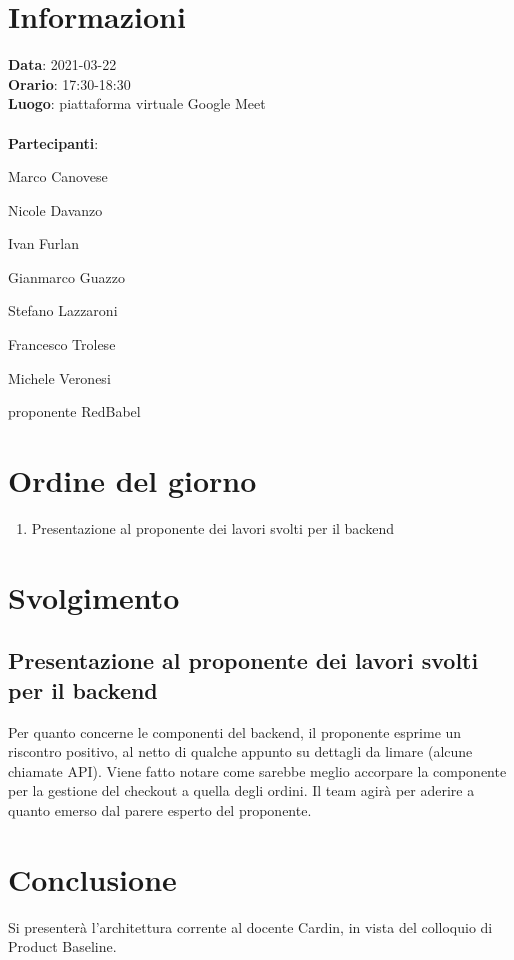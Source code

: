 \section{Informazioni}
\textbf{Data}: 2021-03-22 \\
\textbf{Orario}: 17:30-18:30 \\
\textbf{Luogo}: piattaforma virtuale Google Meet \\\\
\textbf{Partecipanti}:\begin{list}{*}{\setlength{\itemsep}{0cm}}
	\item Marco Canovese
	\item Nicole Davanzo
	\item Ivan Furlan
	\item Gianmarco Guazzo
	\item Stefano Lazzaroni
	\item Francesco Trolese
	\item Michele Veronesi
	\item proponente RedBabel
\end{list}

\section{Ordine del giorno}
\begin{enumerate}
	\item Presentazione al proponente dei lavori svolti per il backend
\end{enumerate}

\section{Svolgimento}
\subsection{Presentazione al proponente dei lavori svolti per il backend}
Per quanto concerne le componenti del backend, il proponente esprime un riscontro positivo, al netto di qualche appunto su dettagli da limare (alcune chiamate API).
Viene fatto notare come sarebbe meglio accorpare la componente per la gestione del checkout a quella degli ordini.
Il team agirà per aderire a quanto emerso dal parere esperto del proponente.

\section{Conclusione}
Si presenterà l'architettura corrente al docente Cardin, in vista del colloquio di Product Baseline.